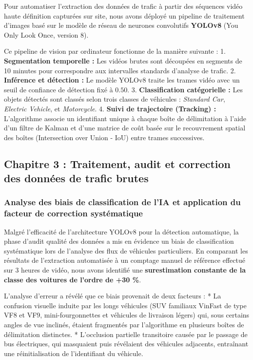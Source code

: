 \documentclass[11pt, a4paper]{article}
\begin{document}
Pour automatiser l'extraction des données de trafic à partir des
séquences vidéo haute définition capturées sur site, nous avons déployé
un pipeline de traitement d'images basé sur le modèle de réseau de
neurones convolutifs \textbf{YOLOv8} (You Only Look Once, version 8).

Ce pipeline de vision par ordinateur fonctionne de la manière suivante :
1. \textbf{Segmentation temporelle :} Les vidéos brutes sont découpées
en segments de 10 minutes pour correspondre aux intervalles standards
d'analyse de trafic. 2. \textbf{Inférence et détection :} Le modèle
YOLOv8 traite les trames vidéo avec un seuil de confiance de détection
fixé à \(0.50\). 3. \textbf{Classification catégorielle :} Les objets
détectés sont classés selon trois classes de véhicules : \emph{Standard
Car}, \emph{Electric Vehicle}, et \emph{Motorcycle}. 4. \textbf{Suivi de
trajectoire (Tracking) :} L'algorithme associe un identifiant unique à
chaque boîte de délimitation à l'aide d'un filtre de Kalman et d'une
matrice de coût basée sur le recouvrement spatial des boîtes
(Intersection over Union - IoU) entre trames successives.

\newpage

\subsection{Chapitre 3 : Traitement, audit et correction des données de
trafic
brutes}\label{chapitre-3-traitement-audit-et-correction-des-donnuxe9es-de-trafic-brutes}

\subsubsection{Analyse des biais de classification de l'IA et
application du facteur de correction
systématique}\label{analyse-des-biais-de-classification-de-lia-et-application-du-facteur-de-correction-systuxe9matique}

Malgré l'efficacité de l'architecture YOLOv8 pour la détection
automatique, la phase d'audit qualité des données a mis en évidence un
biais de classification systématique lors de l'analyse des flux de
véhicules particuliers. En comparant les résultats de l'extraction
automatisée à un comptage manuel de référence effectué sur 3 heures de
vidéo, nous avons identifié une \textbf{surestimation constante de la
classe des voitures de l'ordre de +30 \%}.

L'analyse d'erreur a révélé que ce biais provenait de deux facteurs : *
La confusion visuelle induite par les longs véhicules (SUV familiaux
VinFast de type VF8 et VF9, mini-fourgonnettes et véhicules de livraison
légers) qui, sous certains angles de vue inclinés, étaient fragmentés
par l'algorithme en plusieurs boîtes de délimitation distinctes. *
L'occlusion partielle transitoire causée par le passage de bus
électriques, qui masquaient puis révélaient des véhicules adjacents,
entraînant une réinitialisation de l'identifiant du véhicule.
\end{document}
